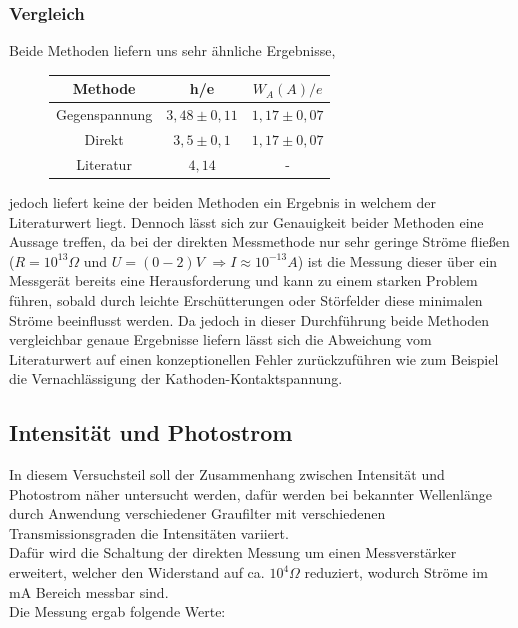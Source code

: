 \documentclass{scrartcl}
\begin{document}
		\subsubsection{Vergleich}
			Beide Methoden liefern uns sehr ähnliche Ergebnisse,
			\begin{figure}[H]
				\centering
				\begin{tabular}{|c|c|c|}
					\hline
					Methode & h/e & $W_A(A)/e$ \\
					\hline
					Gegenspannung & $3,48\pm 0,11$ & $1,17\pm 0,07$ \\
					Direkt & $3,5\pm 0,1$ & $1,17\pm 0,07$ \\
					Literatur & $4,14$ & - \\
					\hline
				\end{tabular}
			\end{figure}

			jedoch liefert keine der beiden Methoden ein Ergebnis in welchem der Literaturwert liegt. Dennoch lässt sich 
			zur Genauigkeit beider Methoden eine Aussage treffen, da bei der direkten Messmethode nur sehr geringe Ströme fließen
			($R=10^{13}\Omega$ und $U=(0-2)V$ $\Rightarrow I\approx 10^{-13}A$) ist die Messung dieser über ein Messgerät bereits eine Herausforderung
			und kann zu einem starken Problem führen, sobald durch leichte Erschütterungen oder Störfelder diese minimalen Ströme beeinflusst werden.
			Da jedoch in dieser Durchführung beide Methoden vergleichbar genaue Ergebnisse liefern lässt sich die Abweichung vom 
			Literaturwert auf einen konzeptionellen Fehler zurückzuführen wie zum Beispiel die Vernachlässigung der Kathoden-Kontaktspannung.

	\subsection{Intensität und Photostrom}
		In diesem Versuchsteil soll der Zusammenhang zwischen Intensität und Photostrom näher untersucht werden, dafür 
		werden bei bekannter Wellenlänge durch Anwendung verschiedener Graufilter mit verschiedenen Transmissionsgraden
		die Intensitäten variiert.\\
		Dafür wird die Schaltung der direkten Messung um einen Messverstärker erweitert, welcher den Widerstand
		auf ca. $10^4 \Omega$ reduziert, wodurch Ströme im mA Bereich messbar sind.\\
		Die Messung ergab folgende Werte:
		
\end{document}
